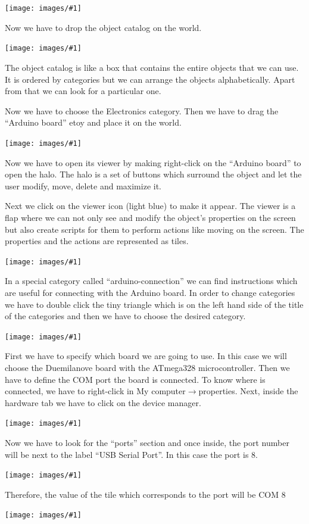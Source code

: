 \documentclass[a4paper,12pt]{article}
\newcommand{\screenshot}[1]
{
\begin{center}
	\texttt{[image: images/\#1]}
\end{center}
}
\begin{document}
\screenshot{02.png}

Now we have to drop the object catalog on the world. 

\screenshot{03.png}

The object catalog is like a box that contains the entire objects that we can
use. It is ordered by categories but we can arrange the objects alphabetically.
Apart from that we can look for a particular one.

Now we have to choose the Electronics category. Then we have to drag the
“Arduino board” etoy and place it on the world.

\screenshot{04.png}
  
Now we have to open its viewer by making right-click on the “Arduino board” to
open the halo. The halo is a set of buttons which surround the object and let
the user modify, move, delete and maximize it.  

Next we click on the viewer icon (light blue) to make it appear. The viewer is
a flap where we can not only see and modify the object’s properties on the
screen but also create scripts for them to perform actions like moving on the
screen. The properties and the actions are represented as tiles.

\screenshot{05.png}


In a special category called “arduino-connection” we can find instructions
which are useful for connecting with the Arduino board. In order to change
categories we have to double click the tiny triangle which is on the left hand
side of the title of the categories and then we have to choose the desired
category. 

\screenshot{06.png}

First we have to specify which board we are going to use.  In this case we will
choose the Duemilanove board with the ATmega328 microcontroller. Then we have
to define the COM port the board is connected. To know where is connected, we
have to right-click in My computer$\rightarrow$properties. Next, inside the
hardware tab we have to click on the device manager. 

\screenshot{07.png}

Now we have to look for the “ports” section and once inside, the port number
will be next to the label “USB Serial Port”. In this case the port is 8. 
 
\screenshot{08.png}

Therefore, the value of the tile which corresponds to the port will be COM 8

\screenshot{09.png}
\end{document}
